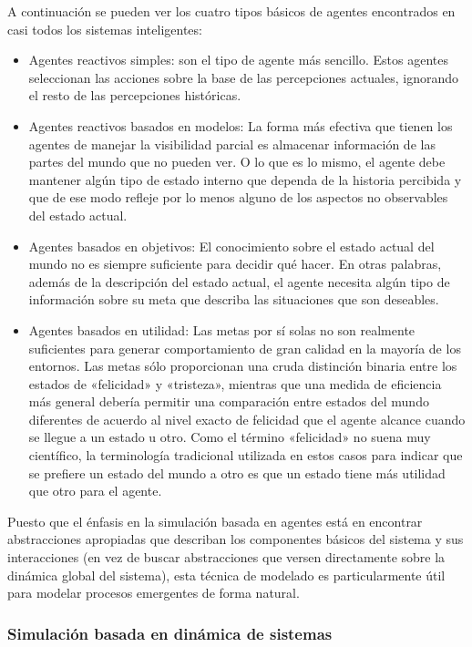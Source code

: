 A continuación se pueden ver los cuatro tipos básicos de agentes encontrados en casi todos los sistemas inteligentes:
\begin{itemize}
	\item Agentes reactivos simples: son el tipo de agente más sencillo. Estos agentes seleccionan las acciones sobre la base de las percepciones actuales, ignorando el resto de las percepciones históricas.
	\item Agentes reactivos basados en modelos: La forma más efectiva que tienen los agentes de manejar la visibilidad parcial es almacenar información de las partes del mundo que no pueden ver. O lo que es lo mismo, el agente debe mantener algún tipo de estado interno que dependa de la historia percibida y que de ese modo refleje por lo menos alguno de los aspectos no observables del estado actual.
	\item Agentes basados en objetivos: El conocimiento sobre el estado actual del mundo no es siempre suficiente para decidir qué hacer. En otras palabras, además de la descripción del estado actual, el agente necesita algún tipo de información sobre su meta que describa las situaciones que son deseables.
	\item Agentes basados en utilidad: Las metas por sí solas no son realmente suficientes para generar comportamiento de gran calidad en la mayoría de los entornos. Las metas sólo proporcionan una cruda distinción binaria entre los estados de «felicidad» y «tristeza», mientras que una medida de eficiencia más general debería permitir una comparación entre estados del mundo diferentes de acuerdo al nivel exacto de felicidad que el agente alcance cuando se llegue a un estado u otro. Como el término «felicidad» no suena muy científico, la terminología tradicional utilizada en estos casos para indicar que se prefiere un estado del mundo a otro es que un estado tiene más utilidad que otro para el agente. \parencite{russell2004inteligencia}
\end{itemize}
Puesto que el énfasis en la simulación basada en agentes está en encontrar abstracciones apropiadas que describan los componentes básicos del sistema y sus interacciones (en vez de buscar abstracciones que versen directamente sobre la dinámica global del sistema), esta técnica de modelado es particularmente útil para modelar procesos emergentes de forma natural.\parencite{izquierdo2008modelado}

\subsubsection{Simulación basada en dinámica de sistemas}
































